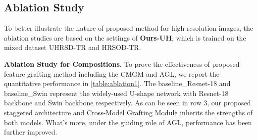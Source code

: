 \documentclass[10pt,twocolumn,letterpaper]{article}
\begin{document}
\subsection{Ablation Study}
To better illustrate the nature of proposed method for high-resolution images, the ablation studies are based on the settings of  \textbf{Ours-UH}, which is trained on the mixed dataset UHRSD-TR and HRSOD-TR.

\textbf{Ablation Study for Compositions.} To prove the effectiveness of proposed feature grafting method including the CMGM and AGL, we report the quantitative performance in \cref{table:ablation1}. The baseline\_Resnet-18 and baseline\_Swin represent the widely-used U-shape network with Resnet-18 backbone and Swin backbone respectively. As can be seen in row 3, our proposed staggered architecture and Cross-Model Grafting Module inherits the strengths of both models. What's more, under the guiding role of AGL, performance has been further improved.





\begin{table}[]
\caption{Performance with the different grafted features. $\bm{R}_i$ denotes the $i$th feature of $\mathbb{R}$ defined in \cref{subsec:feature extracter}, and $\bm{S}_i$ is similar.}
\label{table:ablation2}
\centering
\renewcommand\arraystretch{1}
\end{table}
\end{document}
